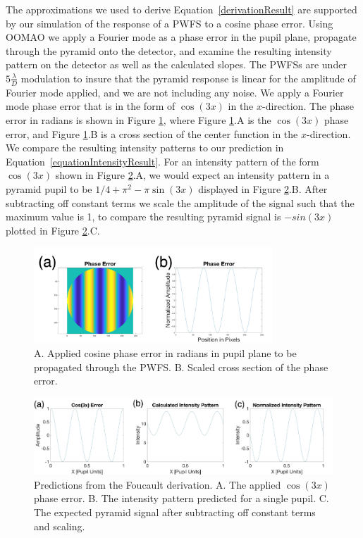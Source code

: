 The approximations we used to derive Equation~\ref{derivationResult} are supported by our simulation of the response of a PWFS to a cosine phase error. Using OOMAO we apply a Fourier mode as a phase error in the pupil plane, propagate through the pyramid onto the detector, and examine the resulting intensity pattern on the detector as well as the calculated slopes. The PWFSs are under $5 \frac{\lambda}{D}$ modulation to insure that the pyramid response is linear for the amplitude of Fourier mode applied, and we are not including any noise. We apply a Fourier mode phase error that is in the form of $\cos(3x)$ in the $x$-direction. The phase error in radians is shown in Figure \ref{fig:CosinePhaseDiagram}, where Figure \ref{fig:CosinePhaseDiagram}.A is the $\cos(3x)$ phase error, and Figure \ref{fig:CosinePhaseDiagram}.B is a cross section of the center function in the $x$-direction. We compare the resulting intensity patterns to our prediction in Equation~\ref{equationIntensityResult}. For an intensity pattern of the form $\cos(3x)$ shown in Figure \ref{fig:MathPredicions}.A, we would expect an intensity pattern in a pyramid pupil to be $1/4+\pi^2-\pi \sin(3x)$ displayed in Figure \ref{fig:MathPredicions}.B. After subtracting off constant terms we scale the amplitude of the signal such that the maximum value is 1, to compare the resulting pyramid signal is $-sin(3x)$ plotted in Figure \ref{fig:MathPredicions}.C.


\begin{figure}
    \centering
    \includegraphics[width=0.8\textwidth]{Chapter Materials/Chapter Two Materials/CosinePhaseDiagram.png}
    \caption{A. Applied cosine phase error in radians in pupil plane to be propagated through the PWFS. B. Scaled cross section of the phase error.}
    \label{fig:CosinePhaseDiagram}
\end{figure}

\begin{figure}
    \centering
    \includegraphics[width=1\textwidth]{Chapter Materials/Chapter Two Materials/MathPredictions.png}
    \caption{Predictions from the Foucault derivation. A. The applied $\cos(3x)$ phase error. B. The intensity pattern predicted for a single pupil. C. The expected pyramid signal after subtracting off constant terms and scaling.}
    \label{fig:MathPredicions}
\end{figure}

